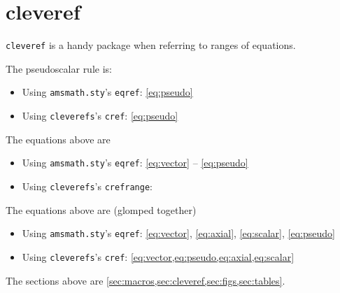 \section{cleveref}
\label{sec:cleveref}

\texttt{cleveref} is a handy package when referring to ranges of equations. 

The pseudoscalar rule is:
\begin{itemize}
	\item Using \texttt{amsmath.sty}'s \texttt{eqref}: \eqref{eq:pseudo}
	\item Using \texttt{cleverefs}'s \texttt{cref}: \cref{eq:pseudo}
\end{itemize}

The equations above are
\begin{itemize}
	\item Using \texttt{amsmath.sty}'s \texttt{eqref}: \eqref{eq:vector} -- \eqref{eq:pseudo}
	\item Using \texttt{cleverefs}'s \texttt{crefrange}: 
\end{itemize}

The equations above are (glomped together)
\begin{itemize}
	\item Using \texttt{amsmath.sty}'s \texttt{eqref}: \eqref{eq:vector}, \eqref{eq:axial}, \eqref{eq:scalar}, \eqref{eq:pseudo}
	\item Using \texttt{cleverefs}'s \texttt{cref}: \cref{eq:vector,eq:pseudo,eq:axial,eq:scalar}
\end{itemize}

The sections above are \cref{sec:macros,sec:cleveref,sec:figs,sec:tables}.